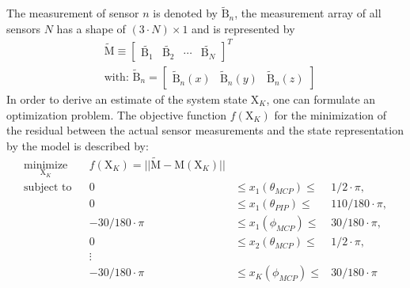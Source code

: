 The measurement of sensor $ n $ is denoted by $ \tilde{\mathrm{B}}_{n} $, the measurement array of all sensors $ N $ has a shape of $ (3 \cdot N) \times 1 $ and is represented by
\begin{equation}
\begin{aligned}
& \tilde{\mathrm{M}} \equiv \begin{bmatrix} \tilde{\mathrm{B}_{1}} & \tilde{\mathrm{B}_{2}} & \cdots & \tilde{\mathrm{B}_{N}} \end{bmatrix}^{T}\\
& \text{with: }  \tilde{\mathrm{B}}_{n} = \begin{bmatrix} \tilde{\mathrm{B}}_{n}(x) & \tilde{\mathrm{B}}_{n}(y) & \tilde{\mathrm{B}}_{n}(z) \end{bmatrix}
\end{aligned}
\end{equation}
In order to derive an estimate of the system state $ \mathrm{X}_K $, one can formulate an optimization problem. The objective function $ f(\mathrm{X}_K) $ for the minimization of the residual between the actual sensor measurements and the state representation by the model is described by:
\begin{equation} \label{eq:minimization}
\begin{aligned}
\underset{\mathrm{X}_K}{\text{minimize}} & & f(\mathrm{X}_K) = || \tilde{\mathrm{M}} - \mathrm{M}(\mathrm{X}_K) ||\\
\text{subject to} & & 0 & \leq {x}_1(\theta_{MCP}) \leq & 1/2 \cdot \pi, \\
				  & & 0 & \leq {x}_1(\theta_{PIP})  \leq & 110/180 \cdot \pi, \\
				  & & -30/180 \cdot \pi & \leq {x}_1(\phi_{MCP}) \leq & 30/180 \cdot \pi, \\
				  & & 0 & \leq {x}_2(\theta_{MCP})  \leq & 1/2 \cdot \pi, \\
				  & & \vdots \\
				  & & -30/180 \cdot \pi & \leq {x}_K(\phi_{MCP}) \leq & 30/180 \cdot \pi
\end{aligned}
\end{equation}
